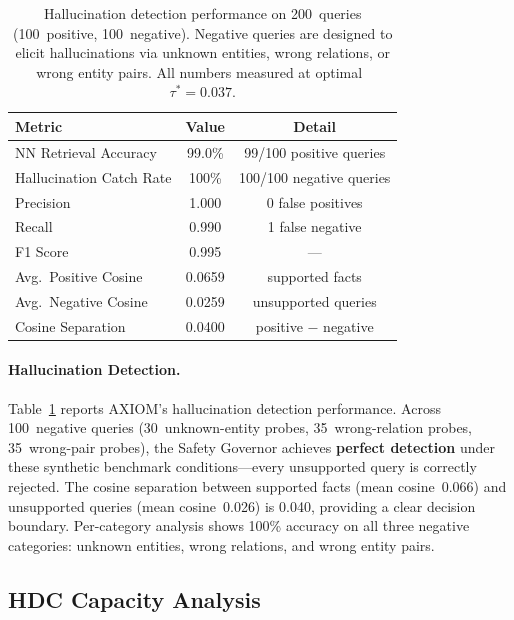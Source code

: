 \documentclass[11pt,a4paper]{article}
\begin{document}
\begin{table}[t]
    \centering
    \caption{Hallucination detection performance on 200~queries
    (100~positive, 100~negative).  Negative queries are designed to
    elicit hallucinations via unknown entities, wrong relations, or
    wrong entity pairs.  All numbers measured at
    optimal~$\tau^{*}\!=\!0.037$.}
    \label{tab:halluc_bench}
    \begin{tabular}{@{}lcc@{}}
        \toprule
        \textbf{Metric} & \textbf{Value} & \textbf{Detail} \\
        \midrule
        NN Retrieval Accuracy   & 99.0\%  & 99/100 positive queries \\
        Hallucination Catch Rate & 100\%  & 100/100 negative queries \\
        Precision               & 1.000   & 0 false positives \\
        Recall                  & 0.990   & 1 false negative \\
        F1 Score                & 0.995   & --- \\
        \midrule
        Avg.\ Positive Cosine   & 0.0659  & supported facts \\
        Avg.\ Negative Cosine   & 0.0259  & unsupported queries \\
        Cosine Separation       & 0.0400  & positive $-$ negative \\
        \bottomrule
    \end{tabular}
\end{table}

\paragraph{Hallucination Detection.}
Table~\ref{tab:halluc_bench} reports AXIOM's hallucination detection
performance.  Across 100~negative queries (30~unknown-entity probes,
35~wrong-relation probes, 35~wrong-pair probes), the Safety Governor
achieves \textbf{perfect detection} under these synthetic
benchmark conditions---every unsupported
query is correctly rejected.  The cosine separation between supported
facts (mean cosine~0.066) and unsupported queries (mean cosine~0.026)
is 0.040, providing a clear decision boundary.  Per-category analysis
shows 100\% accuracy on all three negative categories: unknown entities,
wrong relations, and wrong entity pairs.

\subsection{HDC Capacity Analysis}
\label{sec:capacity}
\end{document}
